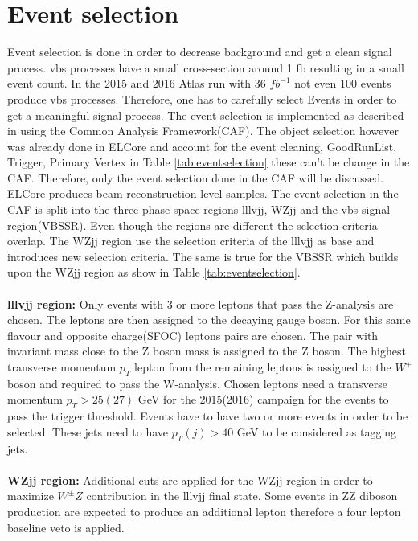\documentclass[../Bachelorarbeit.tex]{subfiles}
\begin{document}
\section{Event selection}
\label{sec:Event_selection}

Event selection is done in order to decrease background and get a clean signal process. \acrshort{vbs} processes have
a small cross-section around 1 fb resulting in a small event count. In the 2015 and 2016 Atlas
run with 36 $fb^{-1}$ not even 100 events produce \acrshort{vbs} processes.
Therefore, one has to carefully select Events in order to get a meaningful signal process. The event selection is implemented
as described in \cite{Bittrich.27.05.2020} using the Common Analysis Framework(CAF)\cite{ATLASGroup.}. The object selection however was already done in ELCore
and account for the event cleaning, GoodRunList, Trigger, Primary Vertex in Table \ref{tab:eventselection} these can't be change in the CAF.
Therefore, only the event selection done in the CAF will be discussed. ELCore produces beam reconstruction
level samples. The event selection in the CAF is split into the three phase space regions lllvjj, WZjj and the \acrshort{vbs} signal region(VBSSR).
Even though the regions are different the selection criteria overlap. The WZjj region use the selection criteria of
the lllvjj as base and introduces new selection criteria.
The same is true for the VBSSR which builds upon the WZjj region as show in Table \ref{tab:eventselection}.
\\\\
\textbf{lllvjj region:} Only events with 3 or more leptons that pass the Z-analysis are chosen. The leptons are then assigned to the decaying gauge boson.
For this same flavour and opposite charge(SFOC) leptons pairs are chosen. The pair with invariant mass close to the Z boson mass is assigned to the Z boson.
The highest transverse momentum $p_{T}$ lepton from the remaining leptons is assigned to the $W^{\pm}$ boson and required to pass the W-analysis.
Chosen leptons need a transverse momentum $p_{T} > 25(27)$ GeV for the 2015(2016) campaign for the events to pass the trigger threshold.
Events have to have two or more events in order to be selected. These jets need to have $p_{T}(j)>40$ GeV to be considered as tagging jets.
\\\\
\textbf{WZjj region:} Additional cuts are applied for the WZjj region in order to maximize $W^{\pm}Z$ contribution in the lllvjj final state.
Some events in ZZ diboson production are expected to produce an additional lepton therefore a four lepton baseline veto is applied.
\end{document}
